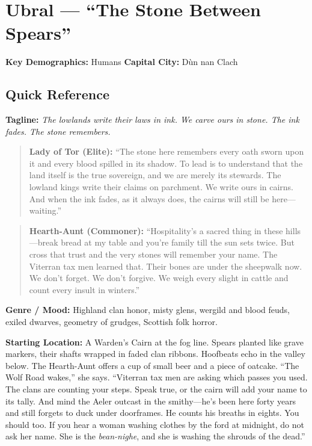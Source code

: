 \section{Ubral --- ``The Stone Between Spears''}
\label{chap:ubral}

\textbf{Key Demographics: } Humans
\textbf{Capital City: } Dùn nan Clach

\subsection*{Quick Reference}
\textbf{Tagline:} \textit{The lowlands write their laws in ink. We carve ours in stone. The ink fades. The stone remembers.}

\begin{quote}
  \textbf{Lady of Tor (Elite):}  
  ``The stone here remembers every oath sworn upon it and every blood spilled in its shadow. To lead is to understand that the land itself is the true sovereign, and we are merely its stewards. The lowland kings write their claims on parchment. We write ours in cairns. And when the ink fades, as it always does, the cairns will still be here---waiting.''
\end{quote}

\begin{quote}
  \textbf{Hearth-Aunt (Commoner):}  
  ``Hospitality's a sacred thing in these hills---break bread at my table and you're family till the sun sets twice. But cross that trust and the very stones will remember your name. The Viterran tax men learned that. Their bones are under the sheepwalk now. We don't forget. We don't forgive. We weigh every slight in cattle and count every insult in winters.''
\end{quote}

\noindent\textbf{Genre / Mood:} Highland clan honor, misty glens, wergild and blood feuds, exiled dwarves, geometry of grudges, Scottish folk horror.

\noindent\textbf{Starting Location:} A Warden's Cairn at the fog line. Spears planted like grave markers, their shafts wrapped in faded clan ribbons. Hoofbeats echo in the valley below. The Hearth-Aunt offers a cup of small beer and a piece of oatcake. ``The Wolf Road wakes,'' she says. ``Viterran tax men are asking which passes you used. The clans are counting your steps. Speak true, or the cairn will add your name to its tally. And mind the Aeler outcast in the smithy---he's been here forty years and still forgets to duck under doorframes. He counts his breaths in eights. You should too. If you hear a woman washing clothes by the ford at midnight, do not ask her name. She is the \textit{bean-nighe}, and she is washing the shrouds of the dead.''

